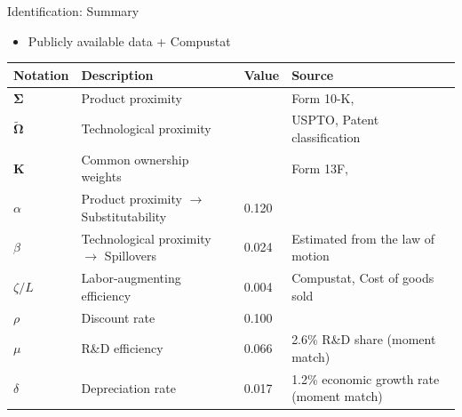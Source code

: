 \documentclass[
  10pt,
  aspectratio=169,   %
]{beamer}
\theoremstyle{plain}
\begin{document}
\begin{frame}{Identification: Summary}
  \begin{itemize}
    \item Publicly available data + Compustat
  \end{itemize}
  \begin{table}[h]
    \centering
    \small %
    \begin{tabular}{llll}
      \toprule
      Notation                  & Description                                      & Value & Source                                        \\
      \midrule
      $\bm{\Sigma}$             & Product proximity                                &       & Form 10-K, \citet{Hoberg2016-jm}              \\
      $\bm{\widetilde{\Omega}}$ & Technological proximity                          &       & USPTO, Patent classification                  \\
      $\bm{K}$                  & Common ownership weights                         &       & Form 13F, \citet{Backus2021-yt}               \\
      $\alpha$                  & Product proximity $\rightarrow$ Substitutability & 0.120 & \citet{Pellegrino2024-dn}                     \\
      $\beta$                   & Technological proximity $\rightarrow$ Spillovers & 0.024 & Estimated from the law of motion              \\
      $\zeta/L$                 & Labor-augmenting efficiency                      & 0.004 & Compustat, Cost of goods sold                 \\
      $\rho$                    & Discount rate                                    & 0.100 & \\
      $\mu$                     & R\&D efficiency                                  & 0.066 & 2.6\% R\&D share (moment match)               \\
      $\delta$                  & Depreciation rate                                & 0.017 & 1.2\% economic growth rate (moment match)     \\
      \bottomrule
    \end{tabular}
  \end{table}
\end{frame}
\end{document}
